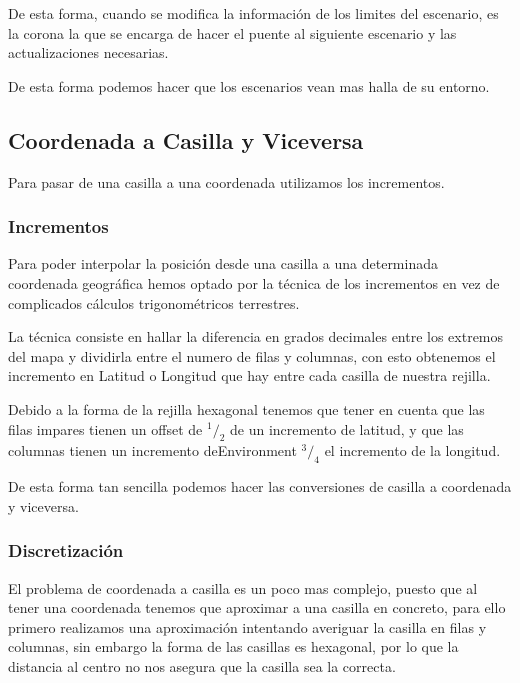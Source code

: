 De esta forma, cuando se modifica la información de los limites del escenario,
es la corona la que se encarga de hacer el puente al siguiente escenario y las
actualizaciones necesarias.

De esta forma podemos hacer que los escenarios vean mas halla de su entorno.

\subsection*{Coordenada a Casilla y Viceversa} \label{coordToCasilla}
Para pasar de una casilla a una coordenada utilizamos los incrementos.

\subsubsection*{Incrementos} \label{incrementos}
Para poder interpolar la posición desde una casilla a una determinada
coordenada geográfica hemos optado por la técnica de los incrementos en vez de
complicados cálculos trigonométricos terrestres.

La técnica consiste en hallar la diferencia en grados decimales entre los
extremos del mapa y dividirla entre el numero de filas y columnas, con esto
obtenemos el incremento en Latitud o Longitud que hay entre cada casilla de
nuestra rejilla.

Debido a la forma de la rejilla hexagonal tenemos que tener en cuenta que las
filas impares tienen un offset de \begin{math} ^1/_2 \end{math} de un incremento
de latitud, y que las columnas tienen un incremento deEnvironment
\begin{math} ^3/_4 \end{math} el incremento de la longitud.

De esta forma tan sencilla podemos hacer las conversiones de casilla a
coordenada y viceversa.
\subsubsection*{Discretización}
El problema de coordenada a casilla es un poco mas complejo, puesto que al
tener una coordenada tenemos que aproximar a una casilla en concreto, para ello
primero realizamos una aproximación intentando averiguar la casilla en filas y
columnas, sin embargo la forma de las casillas es hexagonal, por lo que la
distancia al centro  no nos asegura que la casilla sea la correcta.

